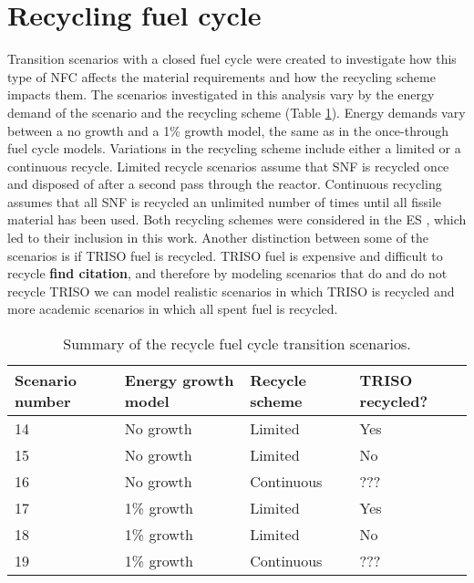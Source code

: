 \section{Recycling fuel cycle}\label{sec:recycle-methods}
Transition scenarios with a closed fuel cycle were created
to investigate how this type of \gls{NFC} affects the material requirements 
and how the recycling scheme impacts them. The scenarios investigated in 
this analysis vary by the energy demand of the scenario and the recycling 
scheme (Table \ref{tab:scenarios_recycle}). Energy demands vary 
between a no growth and a 1\% growth model, the same as in the once-through 
fuel cycle models. Variations in the recycling 
scheme include either a limited or a continuous recycle. Limited recycle 
scenarios assume that \gls{SNF} is recycled once and disposed of after a 
second pass through the reactor. Continuous recycling assumes that all 
\gls{SNF} is recycled an unlimited number of times until all fissile 
material has been used. Both recycling schemes were considered in the 
\acrfull{ES} \cite{wigeland_nuclear_2014}, which led to their inclusion 
in this work. Another distinction between some of the 
scenarios is if \gls{TRISO} fuel is recycled. \gls{TRISO} fuel is 
expensive and difficult to recycle \textbf{find citation}, and 
therefore by modeling scenarios that do and do not recycle 
\gls{TRISO} we can model realistic scenarios in which \gls{TRISO} 
is recycled and more academic scenarios in which all spent fuel is 
recycled. 

\begin{table}[ht]
    \centering
    \caption{Summary of the recycle fuel cycle transition scenarios.}
    \label{tab:scenarios_recycle}
    \begin{tabular}{l l l l}
            \hline
            Scenario number & Energy growth model & Recycle scheme & TRISO recycled?\\
            \hline
            14 & No growth & Limited & Yes\\
            15 & No growth & Limited & No\\
            16 & No growth & Continuous & ??? \\
            17 & 1\% growth & Limited & Yes\\
            18 & 1\% growth & Limited & No\\
            19 & 1\% growth & Continuous & ??? \\
            \hline
    \end{tabular}
\end{table}

